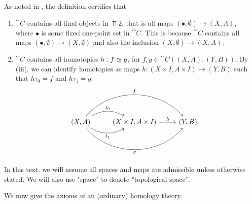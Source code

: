\begin{remark}
As noted in \cite{Werndli}, the definition certifies that
\begin{enumerate}
    \item $\cat{C}$ contains all final objects in $\Top{2}$, that is all maps $(\bullet,\emptyset)\rightarrow (X,A)$, where $\bullet$ is some fixed one-point set in $\cat{C}$. This is because $\cat{C}$ contains all maps $(\bullet,\emptyset)\rightarrow (X,\emptyset)$ and also the inclusion $(X,\emptyset)\rightarrow (X,A)$,
    \item $\cat{C}$ contains all homotopies $h:f\simeq g$, for $f,g\in \cat{C}((X,A),(Y,B))$. By (iii), we can identify homotopies as maps $h:(X\times I,A\times I)\rightarrow (Y,B)$ such that $h\tau_0=f$ and $h\tau_1=g$:
\[\begin{tikzcd}
{(X,A)} \arrow[r, "t_1"', bend right] \arrow[r, "t_0", bend left] \arrow[rr, "f", bend left=49] \arrow[rr, "g"', bend right=49] & {(X\times I,A\times I)} \arrow[r, "h"] & {(Y,B)}
\end{tikzcd}\]
\end{enumerate}

\end{remark}

In this text, we will assume all spaces and maps are admissible unless otherwise stated. We will also use "space" to denote "topological space". 

We now give the axioms of an (ordinary) homology theory.

